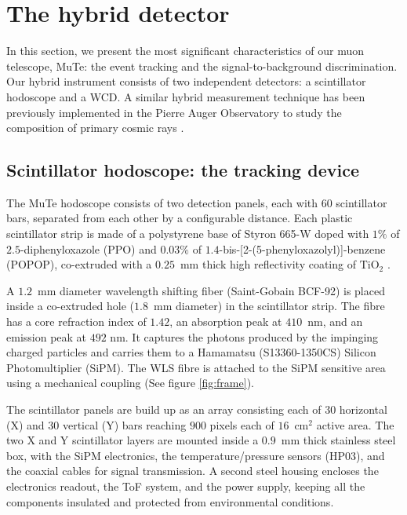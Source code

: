 \documentclass[letterpaper,11pt]{article}
\begin{document}
\section{The hybrid detector}
\label{detector}
In this section, we present the most significant characteristics of our muon telescope, MuTe: the event tracking and the signal-to-background discrimination. Our hybrid instrument consists of two independent detectors: a scintillator hodoscope and a WCD. A similar hybrid measurement technique has been previously implemented in the Pierre Auger Observatory to study the composition of primary cosmic rays \cite{aab2017muon, aab2016prototype}.

\subsection{Scintillator hodoscope: the tracking device}


The MuTe hodoscope consists of two detection panels, each with $60$ scintillator bars, separated from each other by a configurable distance. Each plastic scintillator strip is made of a polystyrene base of Styron 665-W doped with $1\%$ of $2.5$-diphenyloxazole (PPO) and $0.03\%$ of $1.4$-bis-[2-(5-phenyloxazolyl)]-benzene (POPOP), co-extruded with a $0.25$~mm thick high reflectivity coating of $\text{TiO}_{\text{2}}$ \cite{PlaDalmau2003}. 


A $1.2$~mm diameter wavelength shifting fiber (Saint-Gobain BCF-92) is placed inside a co-extruded hole ($1.8$~mm diameter) in the scintillator strip. The fibre has a core refraction index of $1.42$, an absorption peak at $410$~nm, and an emission peak at $492$ nm. It captures the photons produced by the impinging charged particles and carries them to a Hamamatsu (S13360-1350CS) Silicon Photomultiplier (SiPM). The WLS fibre is attached to the SiPM sensitive area using a mechanical coupling (See figure \ref{fig:frame}). 

The scintillator panels are build up as an array consisting each of $30$ horizontal (X) and $30$ vertical (Y) bars reaching $900$ pixels each of $16$~cm$^2$ active area. The two X and Y scintillator layers are mounted inside a $0.9$~mm thick stainless steel box, with the SiPM electronics, the temperature/pressure sensors (HP03), and the coaxial cables for signal transmission. A second steel housing encloses the electronics readout, the ToF system, and the power supply, keeping all the components insulated and protected from environmental conditions. 
\end{document}
